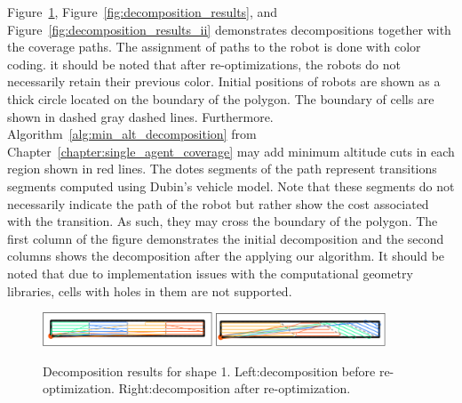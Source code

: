 \documentclass[../main.tex]{subfiles}
\begin{document}
Figure~\ref{fig:decomposition_demo}, Figure~\ref{fig:decomposition_results}, and Figure~\ref{fig:decomposition_results_ii} demonstrates decompositions together with the coverage paths. The assignment of paths to the robot is done with color coding. it should be noted that after re-optimizations, the robots do not necessarily retain their previous color. Initial positions of robots are shown as a thick circle located on the boundary of the polygon. The boundary of cells are shown in dashed gray dashed lines. Furthermore. Algorithm~\ref{alg:min_alt_decomposition} from Chapter~\ref{chapter:single_agent_coverage} may add minimum altitude cuts in each region shown in red lines. The dotes segments of the path represent transitions segments computed using Dubin's vehicle model. Note that these segments do not necessarily indicate the path of the robot but rather show the cost associated with the transition. As such, they may cross the boundary of the polygon. The first column of the figure demonstrates the initial decomposition and the second columns shows the decomposition after the applying our algorithm. It should be noted that due to implementation issues with the computational geometry libraries, cells with holes in them are not supported. 

\begin{figure}
	\centering
	\includegraphics[width=0.45\textwidth]{img/chapter_5/ID_1_orig.pdf}%
	\includegraphics[width=0.45\textwidth]{img/chapter_5/ID_1_reopt.pdf}

	\caption{Decomposition results for shape 1. Left:decomposition before re-optimization. Right:decomposition after re-optimization.}
	\label{fig:decomposition_demo}

\end{figure}
\end{document}
